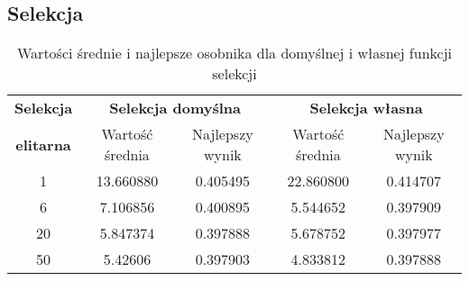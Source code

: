 \subsection{Selekcja}

\begin{table}[!h]
	\centering
	\caption{Wartości średnie i najlepsze osobnika dla domyślnej i własnej funkcji selekcji}
	\label{wyniki_klasyf}
	\begin{tabular}{|c|c|c|c|c|}
		\hline
		\textbf{Selekcja} & \multicolumn{2}{c}{\textbf{Selekcja domyślna}}  & \multicolumn{2}{|c|}{\textbf{Selekcja własna}} \\ \cline{2-5}
		\textbf{elitarna} & Wartość średnia & Najlepszy wynik & Wartość średnia & Najlepszy wynik \\ \hline
		
		1  & 13.660880  & 0.405495 & 22.860800 & 0.414707 \\
		6  & 7.106856 & 0.400895 & 5.544652 & 0.397909 \\
		20 & 5.847374 & 0.397888 & 5.678752 & 0.397977 \\
		50 & 5.42606 & 0.397903 & 4.833812 & 0.397888  \\ \hline      
	\end{tabular}
\end{table}
